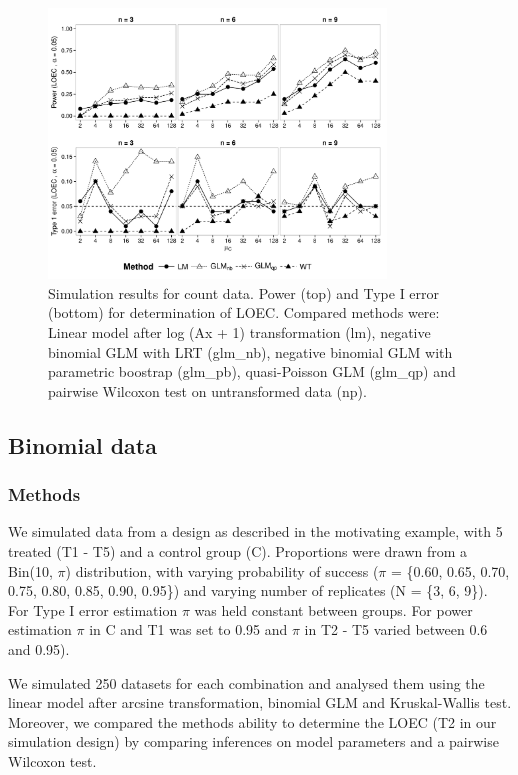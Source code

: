 \documentclass{scrartcl}
\begin{document}
\begin{figure}
  \centering
  \includegraphics[width = 0.8\textwidth]{p_loec_c.pdf}
  \caption{Simulation results for count data. Power (top) and Type I error (bottom) for determination of LOEC. Compared methods were: Linear model after log (Ax + 1) transformation (lm), negative binomial GLM with LRT (glm\_nb), negative binomial GLM with parametric boostrap (glm\_pb), quasi-Poisson GLM (glm\_qp) and pairwise Wilcoxon test on untransformed data (np).}
  \label{fig:p_loec_c}
\end{figure}



\subsection{Binomial data}
\subsubsection{Methods}
We simulated data from a design as described in the motivating example, with 5 treated (T1 - T5) and a control group (C). 
Proportions were drawn from a Bin(10, $\pi$) distribution, with varying probability of success ($\pi$ = \{0.60, 0.65, 0.70, 0.75, 0.80, 0.85, 0.90, 0.95\}) and varying number of replicates (N = \{3, 6, 9\}).
For Type I error estimation $\pi$ was held constant between groups.
For power estimation $\pi$ in C and T1 was set to 0.95 and $\pi$ in T2 - T5 varied between 0.6 and 0.95). 
 
We simulated 250 datasets for each combination and analysed them using the linear model after arcsine transformation, binomial GLM and Kruskal-Wallis test.
Moreover, we compared the methods ability to determine the LOEC (T2 in our simulation design) by comparing inferences on model parameters and a pairwise Wilcoxon test. 
\end{document}
